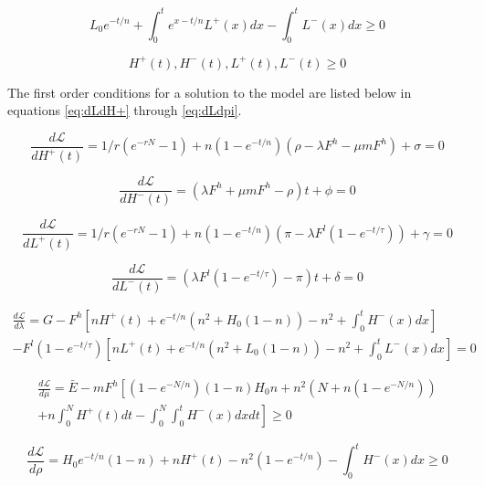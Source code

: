 \documentclass{article}
\newcommand{\Lagr}{\mathcal{L}}
\begin{document}
\begin{equation}\label{eq:analyticalLCapConstraint}
L_0 e^{-t/n} + \int_0^t e^{x-t/n} L^+(x) dx - \int_0^t L^-(x)dx \geq 0 
\end{equation}

\begin{equation}\label{eq:analyticalDecisionVarConstraint}
H^+(t), H^-(t), L^+(t), L^-(t) \geq 0
\end{equation}



The first order conditions for a solution to the model are listed below in equations \ref{eq:dLdH+} through \ref{eq:dLdpi}.


\begin{equation}\label{eq:dLdH+}
\frac{d\Lagr}{dH^+(t)} = 1/r(e^{-rN} -1) + n(1-e^{-t/n})(\rho - \lambda F^h -\mu m F^h) + \sigma = 0
\end{equation}

\begin{equation}\label{eq:dLdH-}
\frac{d\Lagr}{dH^-(t)} = (\lambda F^h +\mu m F^h - \rho)t + \phi = 0
\end{equation}

\begin{equation}\label{eq:dLdL+}
\frac{d\Lagr}{dL^+(t)} = 1/r(e^{-rN} -1) + n(1-e^{-t/n})(\pi - \lambda F^l(1-e^{-t/\tau})) + \gamma = 0
\end{equation}

\begin{equation}\label{eq:dLdL-}
\frac{d\Lagr}{dL^-(t)} = (\lambda F^l(1-e^{-t/\tau}) - \pi)t + \delta = 0
\end{equation}

\begin{multline}\label{eq:dLdlambda}
\frac{d\Lagr}{d\lambda} = G - F^h\left[nH^+(t) + e^{-t/n}(n^2 + H_0(1-n)) - n^2 + \int_0^tH^-(x)dx\right] \\ - F^l (1-e^{-t/\tau})\left[nL^+(t) + e^{-t/n}(n^2 + L_0(1-n)) - n^2 + \int_0^tL^-(x)dx\right] = 0
\end{multline}

\begin{multline}\label{eq:dLdmu}
\frac{d\Lagr}{d\mu} = \bar{E} - mF^h \left [(1-e^{-N/n})(1-n)H_0 n + n^2(N + n(1-e^{-N/n})) \right.\\ + \left. n\int_0^N H^+(t) dt - \int_0^N\int_0^t H^-(x)dx dt   \right] \geq 0
\end{multline}

\begin{equation}\label{eq:dLdrho}
\frac{d\Lagr}{d\rho} = H_0 e^{-t/n}(1-n) + nH^+(t) - n^2(1-e^{-t/n}) - \int_0^t H^-(x)dx \geq 0 
\end{equation}
\end{document}
